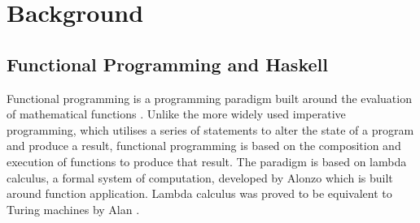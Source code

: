 \documentclass[../main.tex]{subfiles}
\begin{document}
\chapter{Background}






    \section{Functional Programming and Haskell}
        Functional programming is a programming paradigm built around the evaluation of
            mathematical functions \citep{fpPaulHudak}.
        Unlike the more widely used imperative programming, which utilises a series of
            statements to alter the state of a program and produce a result, functional
            programming is based on the composition and execution of functions to produce
            that result.
        The paradigm is based on lambda calculus, a formal system of computation,
            developed by Alonzo \citet{lambdaCalculus} which is built around function
            application.
        Lambda calculus was proved to be equivalent to Turing machines by Alan
            \citet{lambdaTuringComplete}.
\end{document}
